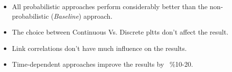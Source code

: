 \documentclass[t]{beamer}
\begin{document}
\begin{frame}
{}
\begin{itemize}
\item<2-> All probabilistic approaches perform considerably better than the non-probabilistic (\textit{Baseline}) approach.
\item<3-> The choice between Continuous Vs. Discrete pltts don't affect the result.
\item<4-> Link correlations don't have much influence on the results.
\item<5-> Time-dependent approaches improve the results by ~\%10-20.
\end{itemize}
\end{frame}
\end{document}
